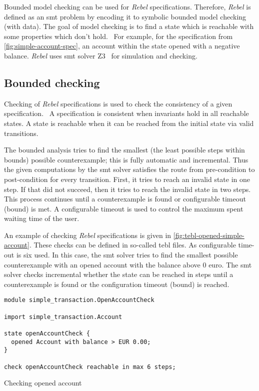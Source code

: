 Bounded model checking can be used for \textit{Rebel} specifications. Therefore,
\textit{Rebel} is defined as an \gls{smt} problem by encoding it to symbolic
bounded model checking (with data). The goal of model checking is to find a
state which is reachable with some properties which don't
hold.~\cite[p.~5]{stoel_storm_vinju_bosman_2016} For example, for the
specification from \autoref{fig:simple-account-spec}, an account within the
state opened with a negative balance. \textit{Rebel} uses \gls{smt} solver
Z3~\cite{moura_bjorner_2008} for simulation and checking.

\subsection{Bounded checking}

Checking of \textit{Rebel} specifications is used to check the consistency of a
given specification.~\cite[p.~5]{stoel_storm_vinju_bosman_2016} A specification
is consistent when invariants hold in all reachable states. A state is reachable
when it can be reached from the initial state via valid transitions.

The bounded analysis tries to find the smallest (the least possible steps within
bounds) possible counterexample; this is fully automatic and incremental.
Thus the given computations by the \gls{smt} solver satisfies the route from
pre-condition to post-condition for every transition.
First, it tries to reach an invalid state in one step. If that did not succeed,
then it tries to reach the invalid state in two steps. This process continues
until a counterexample is found or configurable timeout (bound) is met.
A configurable timeout is used to control the maximum spent waiting time of the
user.~\cite[p.~5]{stoel_storm_vinju_bosman_2016}

An example of checking \textit{Rebel} specifications is given in
\autoref{fig:tebl-opened-simple-account}. These checks can be defined in
so-called tebl files. As configurable time-out is six used.
In this case, the \gls{smt} solver tries to find the smallest possible
counterexample with an opened account with the balance above 0 euro.
The \gls{smt} solver checks incremental whether the state can be reached in
steps until a counterexample is found or the configuration timeout (bound) is
reached.

\begin{sourcecode}[h!]
\begin{lstlisting}[]
module simple_transaction.OpenAccountCheck

import simple_transaction.Account

state openAccountCheck {
  opened Account with balance > EUR 0.00;
}

check openAccountCheck reachable in max 6 steps;
\end{lstlisting}
\caption{Checking opened account}\label{fig:tebl-opened-simple-account}
\end{sourcecode}
\FloatBarrier

